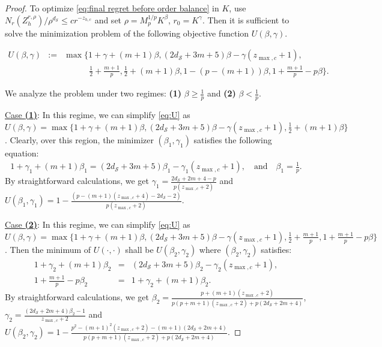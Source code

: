 \documentclass[final,supplement]{siamart251216}
\begin{document}
\begin{proof}
To optimize \eqref{eq:final regret before order balance} in $K$, use $N_r(Z_h^{r,\rho})/\rho^{d_{\mathcal S}}\le cr^{-z_{h,c}}$ and set $\rho=M_p^{1/p}K^\beta$, $r_0=K^\gamma$. Then it is sufficient to solve the minimization problem of the following objective function $U(\beta,\gamma)$.

\begin{eqnarray}\label{eq:U}
    U(\beta,\gamma)&:=&\max\Big\{1+\gamma+(m+1)\beta, (2d_{\mathcal{S}}+3m+5)\beta-\gamma(z_{\max,c}+1), \\
 &&\qquad\quad \frac{1}{2}+\frac{m+1}{p}, \frac{1}{2}+(m+1)\beta, 1-(p-(m+1))\beta, 1+\frac{m+1}{p}-p\beta \Big\}.\nonumber
\end{eqnarray}

We analyze the problem under two regimes: {\bf (1)} $\beta \geq \frac{1}{p}$ and  {\bf (2)} $\beta < \frac{1}{p}$. 

\noindent \underline{Case {\bf (1)}}: In this regime, we can simplify \eqref{eq:U} as
$U(\beta,\gamma)=\max\Big\{1+\gamma+(m+1)\beta,(2d_{\mathcal{S}}+3m+5)\beta-\gamma(z_{\max,c}+1), \frac{1}{2}+(m+1)\beta\Big\}$. Clearly, over this region, the minimizer $(\beta_{1},\gamma_{1})$ satisfies the following equation:
\begin{eqnarray*}
    1+\gamma_{1}+(m+1)\beta_{1}=(2d_{\mathcal{S}}+3m+5)\beta_{1}-\gamma_{1}(z_{\max,c}+1), \,\,\,\,\textrm{ and }\,\,\,\,
    \beta_{1}=\frac{1}{p}.
\end{eqnarray*}
By straightforward calculations, we get $\gamma_{1}=\frac{2d_{\mathcal{S}}+2m+4-p}{p(z_{\max,c}+2)}$ and $U(\beta_{1},\gamma_{1})=1-\frac{(p-(m+1)(z_{\max,c}+4)-2d_{\mathcal{S}}-2)}{{p(z_{\max,c}+2)}}$.

\noindent \underline{Case {\bf (2)}}:
In this regime, we can simplify \eqref{eq:U} as
$U(\beta,\gamma)=\max\Big\{1+\gamma+(m+1)\beta,(2d_{\mathcal{S}}+3m+5)\beta-\gamma(z_{\max,c}+1), \frac{1}{2}+\frac{m+1}{p},1+\frac{m+1}{p}-p\beta\Big\}$. Then the minimum of $U(\cdot,\cdot)$ shall be $U(\beta_{2},\gamma_{2})$ where $(\beta_{2},\gamma_{2})$ satisfies: 
\begin{eqnarray*}
        1+\gamma_{2}+(m+1)\beta_{2}&=&(2d_{\mathcal{S}}+3m+5)\beta_{2}-\gamma_{2}(z_{\max,c}+1),\\
        1+\frac{m+1}{p}-p\beta_{2}&=&1+\gamma_{2}+(m+1)\beta_{2}.
\end{eqnarray*}
By straightforward calculations, we get 
$\beta_{2}=\frac{p+(m+1)(z_{\max,c}+2)}{p(p+m+1)(z_{\max,c}+2)+p(2d_{\mathcal{S}}+2m+4)}$, $\gamma_{2}=\frac{(2d_{\mathcal{S}}+2m+4)\beta_{2}-1}{z_{\max,c}+2}$ and $U(\beta_{2},\gamma_{2})=1-\frac{p^{2}-(m+1)^{2}(z_{\max,c}+2)-(m+1)(2d_{\mathcal{S}}+2m+4)}{p(p+m+1)(z_{\max,c}+2)+p(2d_{\mathcal{S}}+2m+4)}$. 


\end{proof}
\end{document}
